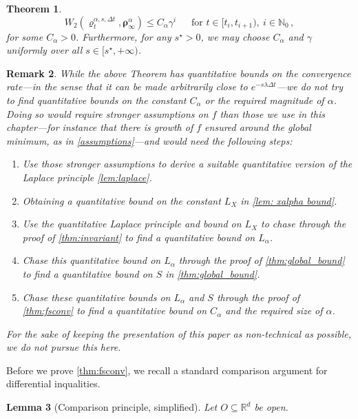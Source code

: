 \documentclass[reqno]{amsart}
\numberwithin{algorithm}{section}
\newcommand{\RR}{\mathbb{R}}
\newcommand{\NN}{{\mathbb N}}
\newtheorem{theorem}{Theorem}[section]
\newtheorem{lemma}[theorem]{Lemma}
\newtheorem{remark}[theorem]{Remark}
\begin{document}
{\begin{theorem}
    \begin{equation}
       W_2(\varrho_{t}^{\alpha,s,\Delta t},\boldsymbol\rho_\infty^\alpha)\leq C_\alpha \gamma^i\ \quad \mbox{ for } t \in [t_i, t_{i+1}), \ i \in \NN_{0} \,,
    \end{equation}
    for some $C_\alpha>0$. Furthermore, for any $s^\star > 0$, we may choose $C_\alpha$ and $\gamma$ uniformly over all $s\in [s^\star, +\infty)$.
\end{theorem}

    \begin{remark}
        While the above Theorem has quantitative bounds on the convergence rate---in the sense that it can be made arbitrarily close to $e^{-s \lambda \Delta t}$---we do not try to find quantitative bounds on the constant $C_\alpha$ or the required magnitude of $\alpha$. Doing so would require stronger assumptions on $f$ than those we use in this chapter---for instance that there is  growth of $f$ ensured around the global minimum,  as in \cref{assumptions}---and would need the following steps:
        \begin{enumerate}
            \item Use those stronger assumptions to derive a suitable quantitative version of the Laplace principle \cref{lem:laplace}.
            \item Obtaining a quantitative bound on the constant $L_X$ in \cref{lem: xalpha bound}.
            \item Use the quantitative Laplace principle and bound on $L_X$ to chase through the proof of \cref{thm:invariant} to find a quantitative bound on $L_\alpha$.
            \item Chase this quantitative bound on $L_\alpha$ through the proof of \cref{thm:global_bound} to find a quantitative bound on $S$ in \cref{thm:global_bound}.
            \item Chase these quantitative bounds on $L_\alpha$ and $S$ through the proof of \cref{thm:fsconv} to find a quantitative bound on $C_\alpha$ and the required size of $\alpha$.
        \end{enumerate}
        For the sake of {keeping the presentation of this paper as non-technical as possible}, we do not pursue this here.
    \end{remark}
Before we prove \cref{thm:fsconv}, we recall a standard comparison argument for differential inqualities.
\begin{lemma}[Comparison principle, simplified]\label{lem:comparison_principle}
    Let $O \subseteq \RR^d$ be open.

\end{lemma}}
\end{document}
